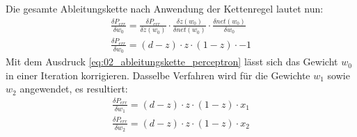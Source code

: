 Die gesamte Ableitungskette nach Anwendung der Kettenregel lautet nun:
\begin{align}
    \frac{\delta P_{err}}{\delta w_0} = \frac{\delta P_{err}}{\delta z(w_0)} \cdot \frac{\delta z(w_0)}{\delta net(w_0)} \cdot \frac{\delta net(w_0)}{\delta w_0}\\
    \frac{\delta P_{err}}{\delta w_0} = (d - z) \cdot z \cdot (1 - z) \cdot -1\label{eq:02_ableitungskette_perceptron}
\end{align}
Mit dem Ausdruck \ref{eq:02_ableitungskette_perceptron} lässt sich das Gewicht $w_0$ in einer Iteration korrigieren.
Dasselbe Verfahren wird für die Gewichte $w_1$ sowie $w_2$ angewendet, es resultiert:
\begin{align}
    \frac{\delta P_{err}}{\delta w_1} = (d - z) \cdot z \cdot (1 - z) \cdot x_1\\
    \frac{\delta P_{err}}{\delta w_2} = (d - z) \cdot z \cdot (1 - z) \cdot x_2
\end{align}

\newpage
